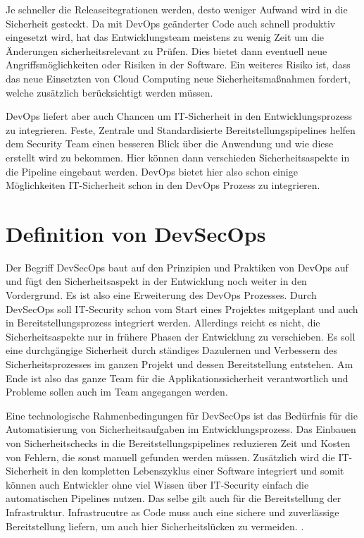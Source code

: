 Je schneller die Releaseitegrationen werden, desto weniger Aufwand wird in die Sicherheit gesteckt. Da mit DevOps geänderter Code auch schnell produktiv eingesetzt wird, hat das Entwicklungsteam meistens zu wenig Zeit um die Änderungen sicherheitsrelevant zu Prüfen. Dies bietet dann eventuell neue Angriffsmöglichkeiten oder Risiken in der Software.
Ein weiteres Risiko ist, dass das neue Einsetzten von Cloud Computing neue Sicherheitsmaßnahmen fordert, welche zusätzlich berücksichtigt werden müssen.


DevOps liefert aber auch Chancen um IT-Sicherheit in den Entwicklungsprozess zu integrieren.
Feste, Zentrale und Standardisierte Bereitstellungspipelines helfen dem Security Team einen besseren Blick über die Anwendung und wie diese erstellt wird zu bekommen. Hier können dann verschieden Sicherheitsaspekte in die Pipeline eingebaut werden. DevOps bietet hier also schon einige Möglichkeiten IT-Sicherheit schon in den DevOps Prozess zu integrieren. \cite{grey}

\section{Definition von DevSecOps}
Der Begriff DevSecOps baut auf den Prinzipien und Praktiken von DevOps auf und fügt den Sicherheitsaspekt in der Entwicklung noch weiter in den Vordergrund. Es ist also eine Erweiterung des DevOps Prozesses. Durch DevSecOps soll IT-Security schon vom Start eines Projektes mitgeplant und auch in Bereitstellungsprozess integriert werden. Allerdings reicht es nicht, die Sicherheitsaspekte nur in frühere Phasen der Entwicklung zu verschieben. Es soll eine durchgängige Sicherheit durch ständiges Dazulernen und Verbessern des Sicherheitsprozesses im ganzen Projekt und dessen Bereitstellung entstehen. \cite{grey}
Am Ende ist also das ganze Team für die Applikationssicherheit verantwortlich und Probleme sollen auch im Team angegangen werden. \cite{devsecops-techniques}

Eine technologische Rahmenbedingungen für DevSecOps ist das Bedürfnis für die Automatisierung von Sicherheitsaufgaben im Entwicklungsprozess. Das Einbauen von Sicherheitschecks in die Bereitstellungspipelines reduzieren Zeit und Kosten von Fehlern, die sonst manuell gefunden werden müssen. Zusätzlich wird die IT-Sicherheit in den kompletten Lebenszyklus einer Software integriert und somit können auch Entwickler ohne viel Wissen über IT-Security einfach die automatischen Pipelines nutzen. Das selbe gilt auch für die Bereitstellung der Infrastruktur. Infrastrucutre as Code muss auch eine sichere und zuverlässige Bereitstellung liefern, um auch hier Sicherheitslücken zu vermeiden. \cite{grey}.

